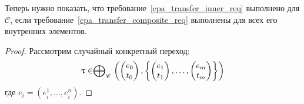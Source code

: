 \begin{itemize}

Теперь нужно показать, что требование~\ref{cpa_transfer_inner_req} выполнено для $\mathscr{C}$, если требование~\ref{cpa_transfer_composite_req} выполнены для всех его внутренних элементов. 

\begin{proof}
Рассмотрим случайный конкретный переход:
$$\uptau \in  \mathrel{\bigoplus}_{\mathscr{C}}
\left(
\begin{pmatrix}
e_0 \\
t_0 
\end{pmatrix},
\left\{
\begin{pmatrix}
e_1 \\
t_1 
\end{pmatrix},
\dots ,
\begin{pmatrix}
e_m \\
t_m 
\end{pmatrix}
\right\}
\right)$$
где $e_i=(e^1_i, \dots, e^n_i)$.


\end{proof}
\end{itemize}

